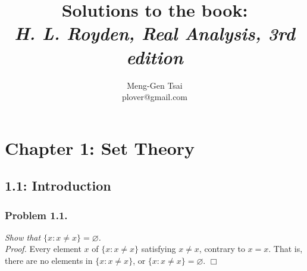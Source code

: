 \documentclass{article}
\title{\textbf{Solutions to the book: \\ \emph{H. L. Royden, Real Analysis, 3rd edition}}}
\author{Meng-Gen Tsai \\ plover@gmail.com}
\begin{document}
\maketitle
\tableofcontents












\newpage
\section*{Chapter 1: Set Theory \\}



\subsection*{1.1: Introduction \\}



\subsubsection*{Problem 1.1.}
\emph{Show that $\{ x : x \neq x \} = \varnothing$.} \\

\emph{Proof.}
Every element $x$ of $\{ x : x \neq x \}$ satisfying $x \neq x$,
contrary to $x = x$. That is, there are no elements in $\{ x : x \neq x \}$,
or $\{ x : x \neq x \} = \varnothing$.
$\Box$ \\\\



\end{document}

